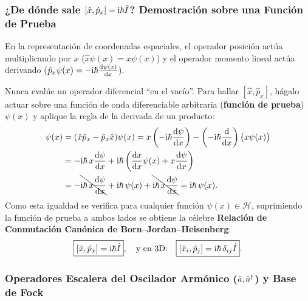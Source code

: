 \subsubsection{¿De dónde sale \texorpdfstring{$[\hat{x}, \hat{p}_x] = \mathrm{i}\hbar\hat{I}$}{[x, px] = ihbar I}? Demostración sobre una Función de Prueba}

En la representación de coordenadas espaciales, el operador posición actúa multiplicando por $x$ ($\hat{x}\psi(x) = x\psi(x)$) y el operador momento lineal actúa derivando ($\hat{p}_x\psi(x) = -\mathrm{i}\hbar\frac{\mathrm{d}\psi(x)}{\mathrm{d} x}$).

\begin{alertabox}
    Nunca evalúe un operador diferencial \enquote{en el vacío}. Para hallar $[\hat{x}, \hat{p}_x]$, hágalo actuar sobre una función de onda diferenciable arbitraria (\textbf{función de prueba}) $\psi(x)$ y aplique la regla de la derivada de un producto:
    \begin{align}
        [\hat{x}, \hat{p}_x]\psi(x) &= (\hat{x}\hat{p}_x - \hat{p}_x\hat{x})\psi(x) = x\left(-\iu\hbar\frac{\dif\psi}{\dif x}\right) - \left(-\iu\hbar\frac{\dif}{\dif x}\right)\big(x\psi(x)\big) \nonumber\\
        &= -\iu\hbar\,x\frac{\dif\psi}{\dif x} + \iu\hbar\left( \frac{\dif x}{\dif x}\psi(x) + x\frac{\dif\psi}{\dif x} \right) \nonumber\\
        &= -\bcancel{\iu\hbar\,x\frac{\dif\psi}{\dif x}} + \iu\hbar\,\psi(x) + \bcancel{\iu\hbar\,x\frac{\dif\psi}{\dif x}} = \iu\hbar\,\psi(x).
    \end{align}
    Como esta igualdad se verifica para cualquier función $\psi(x) \in \mathcal{H}$, suprimiendo la función de prueba a ambos lados se obtiene la célebre \textbf{Relación de Conmutación Canónica de Born--Jordan--Heisenberg}:
    \begin{equation}
        \boxed{[\hat{x}, \hat{p}_x] = \mathrm{i}\hbar\hat{I}}, \quad \text{y en 3D:} \quad \boxed{[\hat{x}_i, \hat{p}_j] = \mathrm{i}\hbar\,\delta_{ij}\hat{I}}.
    \end{equation}
\end{alertabox}

\subsubsection{Operadores Escalera del Oscilador Armónico (\texorpdfstring{$\hat{a}, \hat{a}^\dagger$}{a, a+}) y Base de Fock}

